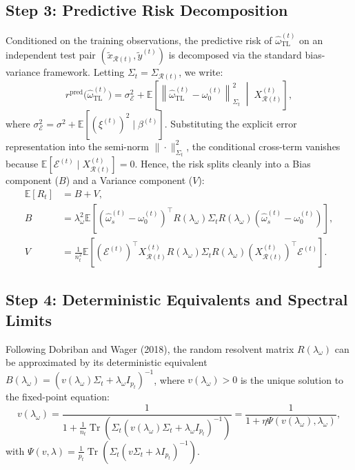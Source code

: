 \documentclass{article}
\begin{document}
\subsection{Step 3: Predictive Risk Decomposition}
Conditioned on the training observations, the predictive risk of $\hat\omega_{\mathrm{TL}}^{(t)}$ on an independent test pair $(\tilde x_{\mathcal{R}(t)}, \tilde y^{(t)})$ is decomposed via the standard bias-variance framework. Letting $\Sigma_t = \Sigma_{\mathcal{R}(t)}$, we write:
\begin{equation}
r^{\mathrm{pred}}\!\bigl(\hat\omega_{\mathrm{TL}}^{(t)}\bigr) = \sigma_{\mathcal{E}}^2 + \mathbb{E}\left[ \left\| \hat\omega_{\mathrm{TL}}^{(t)} - \omega_0^{(t)} \right\|_{\Sigma_t}^2 \;\middle|\; X_{\mathcal{R}(t)}^{(t)} \right],
\end{equation}
where $\sigma_{\mathcal{E}}^2 = \sigma^2 + \mathbb{E}[(\xi^{(t)})^2 \mid \beta^{(t)}]$. Substituting the explicit error representation into the semi-norm $\|\cdot\|_{\Sigma_t}^2$, the conditional cross-term vanishes because $\mathbb{E}[\mathcal{E}^{(t)} \mid X^{(t)}_{\mathcal{R}(t)}] = 0$. Hence, the risk splits cleanly into a Bias component ($B$) and a Variance component ($V$):
\begin{align}
\mathbb{E}[R_t] &= B + V, \\
B &= \lambda_\omega^2 \mathbb{E}\left[ (\hat\omega_s^{(t)} - \omega_0^{(t)})^\top R(\lambda_\omega) \Sigma_t R(\lambda_\omega) (\hat\omega_s^{(t)} - \omega_0^{(t)}) \right], \\
V &= \frac{1}{n_t^2} \mathbb{E}\left[ (\mathcal{E}^{(t)})^\top X^{(t)}_{\mathcal{R}(t)} R(\lambda_\omega) \Sigma_t R(\lambda_\omega) (X^{(t)}_{\mathcal{R}(t)})^\top \mathcal{E}^{(t)} \right].
\end{align}

\subsection{Step 4: Deterministic Equivalents and Spectral Limits}
Following Dobriban and Wager (2018), the random resolvent matrix $R(\lambda_\omega)$ can be approximated by its deterministic equivalent $B(\lambda_\omega) = (v(\lambda_\omega) \Sigma_t + \lambda_\omega I_{p_t})^{-1}$, where $v(\lambda_\omega) > 0$ is the unique solution to the fixed-point equation:
\begin{equation}
v(\lambda_\omega) = \frac{1}{1 + \frac{1}{n_t} \operatorname{Tr}\left(\Sigma_t (v(\lambda_\omega) \Sigma_t + \lambda_\omega I_{p_t})^{-1}\right)} = \frac{1}{1 + \eta \Psi(v(\lambda_\omega), \lambda_\omega)},
\end{equation}
with $\Psi(v, \lambda) = \frac{1}{p_t} \operatorname{Tr}(\Sigma_t (v\Sigma_t + \lambda I_{p_t})^{-1})$. 
\end{document}
